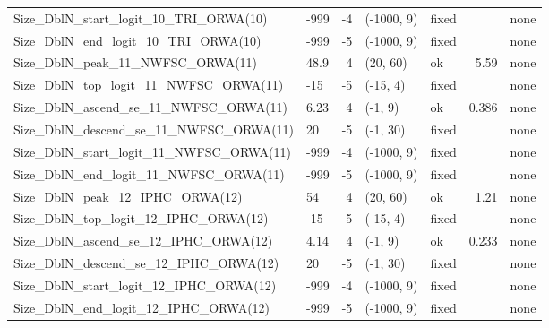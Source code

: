 \documentclass[
  english,
]{article}
\begin{document}
\begin{landscape}
\begin{longtable}{llrllrl}
Size\_DblN\_start\_logit\_10\_TRI\_ORWA(10) & -999 & -4 & (-1000, 9) & fixed &  & none \\ 
Size\_DblN\_end\_logit\_10\_TRI\_ORWA(10) & -999 & -5 & (-1000, 9) & fixed &  & none \\ 
Size\_DblN\_peak\_11\_NWFSC\_ORWA(11) & 48.9 & 4 & (20, 60) & ok & 5.59 & none \\ 
Size\_DblN\_top\_logit\_11\_NWFSC\_ORWA(11) & -15 & -5 & (-15, 4) & fixed &  & none \\ 
Size\_DblN\_ascend\_se\_11\_NWFSC\_ORWA(11) & 6.23 & 4 & (-1, 9) & ok & 0.386 & none \\ 
Size\_DblN\_descend\_se\_11\_NWFSC\_ORWA(11) & 20 & -5 & (-1, 30) & fixed &  & none \\ 
Size\_DblN\_start\_logit\_11\_NWFSC\_ORWA(11) & -999 & -4 & (-1000, 9) & fixed &  & none \\ 
Size\_DblN\_end\_logit\_11\_NWFSC\_ORWA(11) & -999 & -5 & (-1000, 9) & fixed &  & none \\ 
Size\_DblN\_peak\_12\_IPHC\_ORWA(12) & 54 & 4 & (20, 60) & ok & 1.21 & none \\ 
Size\_DblN\_top\_logit\_12\_IPHC\_ORWA(12) & -15 & -5 & (-15, 4) & fixed &  & none \\ 
Size\_DblN\_ascend\_se\_12\_IPHC\_ORWA(12) & 4.14 & 4 & (-1, 9) & ok & 0.233 & none \\ 
Size\_DblN\_descend\_se\_12\_IPHC\_ORWA(12) & 20 & -5 & (-1, 30) & fixed &  & none \\ 
Size\_DblN\_start\_logit\_12\_IPHC\_ORWA(12) & -999 & -4 & (-1000, 9) & fixed &  & none \\ 
Size\_DblN\_end\_logit\_12\_IPHC\_ORWA(12) & -999 & -5 & (-1000, 9) & fixed &  & none \\ 
\bottomrule

\end{longtable}

\endgroup

\end{landscape}

\newpage{}
\end{document}
